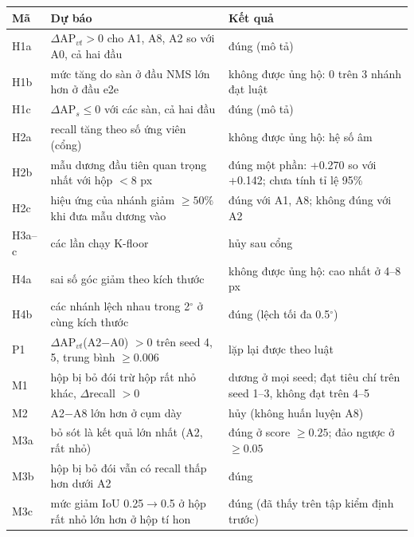 \begin{tabular}{lp{6.2cm}p{6.2cm}}
\toprule
Mã & Dự báo & Kết quả \\
\midrule
H1a & $\Delta$AP$_{vt}>0$ cho A1, A8, A2 so với A0, cả hai đầu & đúng (mô tả) \\
H1b & mức tăng do sàn ở đầu NMS lớn hơn ở đầu e2e & không được ủng hộ: 0 trên 3 nhánh đạt luật \\
H1c & $\Delta$AP$_s\leq 0$ với các sàn, cả hai đầu & đúng (mô tả) \\
H2a & recall tăng theo số ứng viên (cổng) & không được ủng hộ: hệ số âm \\
H2b & mẫu dương đầu tiên quan trọng nhất với hộp $<8$ px & đúng một phần: +0.270 so với +0.142; chưa tính tỉ lệ 95\% \\
H2c & hiệu ứng của nhánh giảm $\geq 50\%$ khi đưa mẫu dương vào & đúng với A1, A8; không đúng với A2 \\
H3a--c & các lần chạy K-floor & hủy sau cổng \\
H4a & sai số góc giảm theo kích thước & không được ủng hộ: cao nhất ở 4--8 px \\
H4b & các nhánh lệch nhau trong 2$^\circ$ ở cùng kích thước & đúng (lệch tối đa 0.5$^\circ$) \\
P1 & $\Delta$AP$_{vt}$(A2$-$A0) $>0$ trên seed 4, 5, trung bình $\geq 0.006$ & lặp lại được theo luật \\
M1 & hộp bị bỏ đói trừ hộp rất nhỏ khác, $\Delta$recall $>0$ & dương ở mọi seed; đạt tiêu chí trên seed 1--3, không đạt trên 4--5 \\
M2 & A2$-$A8 lớn hơn ở cụm dày & hủy (không huấn luyện A8) \\
M3a & bỏ sót là kết quả lớn nhất (A2, rất nhỏ) & đúng ở score $\geq 0.25$; đảo ngược ở $\geq 0.05$ \\
M3b & hộp bị bỏ đói vẫn có recall thấp hơn dưới A2 & đúng \\
M3c & mức giảm IoU 0.25$\to$0.5 ở hộp rất nhỏ lớn hơn ở hộp tí hon & đúng (đã thấy trên tập kiểm định trước) \\
\bottomrule
\end{tabular}
